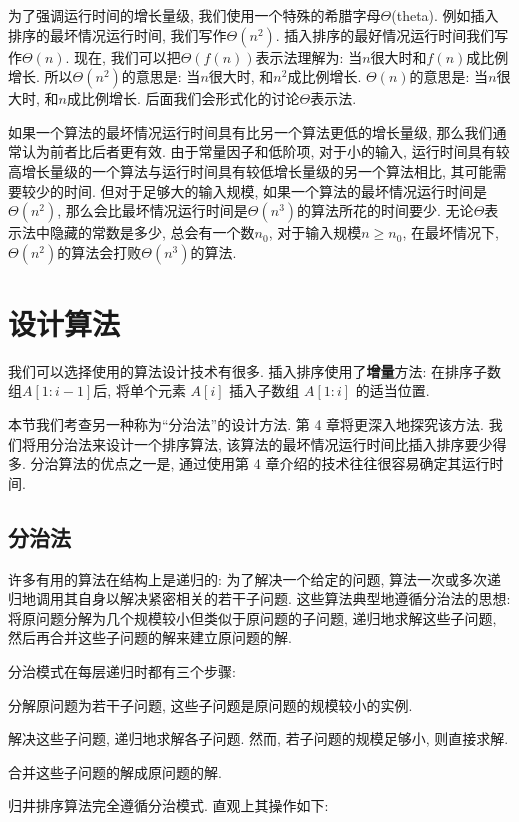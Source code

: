 \documentclass[oneside,10pt,fontset=none]{ctexbook}
\begin{document}
为了强调运行时间的增长量级, 我们使用一个特殊的希腊字母$\Theta$(theta). 例如插入排序的最坏情况运行时间, 我们写作$\Theta(n^2)$. 插入排序的最好情况运行时间我们写作$\Theta(n)$. 现在, 我们可以把$\Theta(f(n))$表示法理解为: 当$n$很大时和$f(n)$成比例增长. 所以$\Theta(n^2)$的意思是: 当$n$很大时, 和$n^2$成比例增长. $\Theta(n)$的意思是: 当$n$很大时, 和$n$成比例增长. 后面我们会形式化的讨论$\Theta$表示法.

如果一个算法的最坏情况运行时间具有比另一个算法更低的增长量级, 那么我们通常认为前者比后者更有效. 由于常量因子和低阶项, 对于小的输入, 运行时间具有较高增长量级的一个算法与运行时间具有较低增长量级的另一个算法相比, 其可能需要较少的时间. 但对于足够大的输入规模, 如果一个算法的最坏情况运行时间是$\Theta(n^2)$, 那么会比最坏情况运行时间是$\Theta(n^3)$的算法所花的时间要少. 无论$\Theta$表示法中隐藏的常数是多少, 总会有一个数$n_0$, 对于输入规模$n\geq n_0$, 在最坏情况下, $\Theta(n^2)$的算法会打败$\Theta(n^3)$的算法.

\section{设计算法}

我们可以选择使用的算法设计技术有很多. 插入排序使用了\textbf{增量}方法: 在排序子数组$A[1:i-1]$后, 将单个元素 $A[i]$ 插入子数组 $A[1:i]$ 的适当位置.

本节我们考查另一种称为``分治法''的设计方法. 第 4 章将更深入地探究该方法. 我们将用分治法来设计一个排序算法, 该算法的最坏情况运行时间比插入排序要少得多. 分治算法的优点之一是, 通过使用第 4 章介绍的技术往往很容易确定其运行时间.

\subsection{分治法}

许多有用的算法在结构上是递归的: 为了解决一个给定的问题, 算法一次或多次递归地调用其自身以解决紧密相关的若干子问题. 这些算法典型地遵循分治法的思想: 将原问题分解为几个规模较小但类似于原问题的子问题, 递归地求解这些子问题, 然后再合并这些子问题的解来建立原问题的解.

分治模式在每层递归时都有三个步骤:

分解原问题为若干子问题, 这些子问题是原问题的规模较小的实例.

解决这些子问题, 递归地求解各子问题. 然而, 若子问题的规模足够小, 则直接求解.

合并这些子问题的解成原问题的解.

归井排序算法完全遵循分治模式. 直观上其操作如下:
\end{document}
